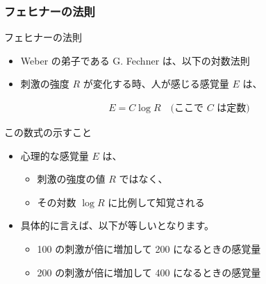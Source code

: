 \documentclass[12pt, dvipdfmx]{beamer}
\begin{document}
\begin{frame}
	\frametitle{フェヒナーの法則}
		\begin{exampleblock}{フェヒナーの法則}
			\begin{itemize}
				\item Weber の弟子である G. Fechner は、以下の対数法則
				\item 刺激の強度 $R$ が変化する時、人が感じる感覚量 $E$ は、
			\end{itemize}
			\vspace{-3mm}
			\begin{align*}
				E = C \log R \quad \text{(ここで $C$ は定数)}
			\end{align*}
		\end{exampleblock}
		\begin{block}{この数式の示すこと}
			\begin{itemize}
				\item 心理的な感覚量 $E$ は、
				\begin{itemize}
					\item 刺激の強度の値 $R$ ではなく、
					\item その対数 $\log R $ に比例して知覚される
				\end{itemize}
				\item 具体的に言えば、以下が等しいとなります。
					\begin{itemize}
						\item 100 の刺激が倍に増加して 200 になるときの感覚量
						\item 200 の刺激が倍に増加して 400 になるときの感覚量
					\end{itemize}
			\end{itemize}
			
		\end{block}
\end{frame}
\end{document}
